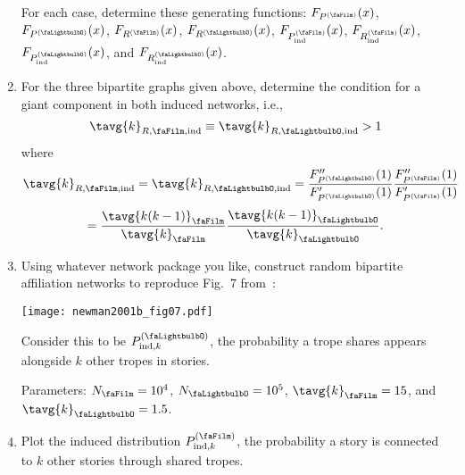 \begin{enumerate}
  For each case, determine these generating functions:
    $F_{P^{(\rbone)}}(x)$,
    $F_{P^{(\rbtwo)}}(x)$,
    $F_{R^{(\rbone)}}(x)$,
    $F_{R^{(\rbtwo)}}(x)$,
    $F_{\Prboneindplain}(x)$,
    $F_{\Rrboneindplain}(x)$,
    $F_{\Prbtwoindplain}(x)$,
    and
    $F_{\Rrbtwoindplain}(x)$.

    
   \solutionstart


   \solutionend

\item
  
  For the three bipartite graphs given above,
  determine the condition for a giant component
  in both induced networks, i.e., 
  $$
  \tavg{k}_{R,\rbone,\textnormal{ind}}
  \equiv
  \tavg{k}_{R,\rbtwo,\textnormal{ind}}
  > 1
  $$
  where
  $$
  \tavg{k}_{R,\rbone,\textnormal{ind}}
  =
  \tavg{k}_{R,\rbtwo,\textnormal{ind}}
  =
  \frac{
    F''_{P^{(\rbtwo)}}(1)
  }
  {
    F'_{P^{(\rbtwo)}}(1)
  }
  \frac{
    F''_{P^{(\rbone)}}(1)
  }
  {
    F'_{P^{(\rbone)}}(1)
  }
  $$
  $$
  =
  \frac{\tavg{k(k-1)}_{\rbone}}
  {\tavg{k}_{\rbone}}
  \frac{\tavg{k(k-1)}_{\rbtwo}}
  {\tavg{k}_{\rbtwo}}.
  $$

  
   \solutionstart


   \solutionend
  
\item
  
  Using whatever network package you like, 
  construct random bipartite affiliation networks
  to reproduce Fig.~7 from~\cite{newman2001b}:

  \begin{center}
    \texttt{[image: newman2001b\_fig07.pdf]}
  \end{center}

  Consider this to be $\Prbtwoind$, the probability a trope shares 
  appears alongside $k$ other tropes in stories.

  Parameters: 
  $N_\rbone = 10^{4}$,
  $N_\rbtwo = 10^{5}$,
  $\tavg{k}_\rbone = 15$,
  and
  $\tavg{k}_\rbtwo = 1.5$.
  
  
   \solutionstart


   \solutionend

\item

  Plot the induced distribution $\Prboneind$,
  the probability a story is connected to 
  $k$ other stories through shared tropes.


\end{enumerate}
